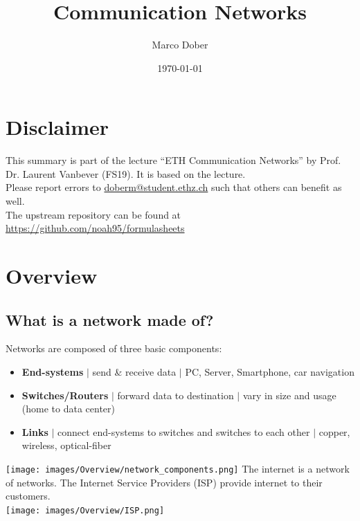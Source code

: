 \documentclass[a4paper, fontsize=8pt, landscape, DIV=1]{scrartcl}
\title{Communication Networks}
\author{Marco Dober}
\date{\today}
\begin{document}
	\setcounter{secnumdepth}{3} %
	\begin{multicols*}{4}
		\section*{Disclaimer}
		This summary is part of the lecture ``ETH Communication Networks'' by Prof. Dr. Laurent Vanbever (FS19). It is based on the lecture. \\[6pt]
		Please report errors to \href{mailto:doberm@student.ethz.ch}{doberm@student.ethz.ch} such that others can benefit as well.\\[6pt]	
		The upstream repository can be found at \href{https://github.com/noah95/formulasheets}{https://github.com/noah95/formulasheets}
		\vfill\null
		\pagebreak
		
		\maketitle 
		\thispagestyle{fancy}
		
		\section{Overview}
		\subsection{What is a network made of?}
		Networks are composed of three basic components:
		\begin{itemize}
			\item \textbf{End-systems} $\vert$ send \& receive data $\vert$  PC,
			Server, Smartphone, car navigation
			\item \textbf{Switches/Routers} $\vert$ forward data to destination $\vert$
			vary in size and usage (home to data center)
			\item \textbf{Links} $\vert$ connect end-systems to switches and switches
			to each other $\vert$ copper, wireless, optical-fiber
		\end{itemize}
		\texttt{[image: images/Overview/network\_components.png]}
		The internet is a network of networks. The Internet Service Providers (ISP)
		provide internet to their customers.\\
		\texttt{[image: images/Overview/ISP.png]}
		\columnbreak
		

\end{multicols*}
\end{document}
